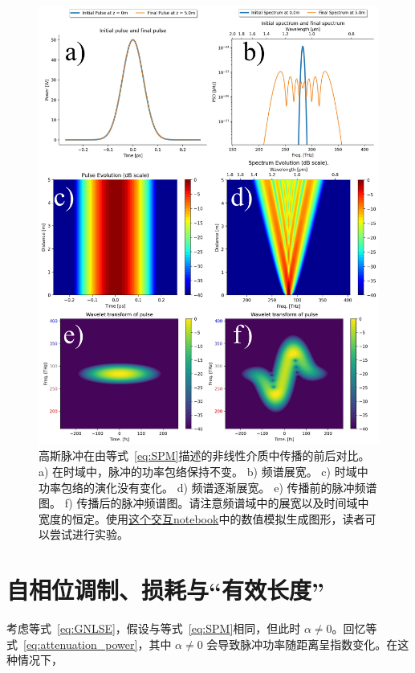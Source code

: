 \begin{figure}
    \centering
    \includegraphics[width=1\linewidth]{figures/SPM_combined.png}
    \caption{ 高斯脉冲在由等式~\ref{eq:SPM}描述的非线性介质中传播的前后对比。
    a) 在时域中，脉冲的功率包络保持不变。 b) 频谱展宽。 c) 时域中功率包络的演化没有变化。 d) 频谱逐渐展宽。 e) 传播前的脉冲频谱图。 f) 传播后的脉冲频谱图。请注意频谱域中的展宽以及时间域中宽度的恒定。使用\href{https://colab.research.google.com/drive/1P41F4hO6Mv12RsEkpogYv5teQyFZ6iW0?usp=sharing}{这个交互notebook}中的数值模拟生成图形，读者可以尝试进行实验。}
    \label{fig:SPM_before_and_after}
\end{figure}


\section{自相位调制、损耗与“有效长度”}
考虑等式~\ref{eq:GNLSE}，假设与等式~\ref{eq:SPM}相同，但此时 $\alpha\neq0$。回忆等式~\ref{eq:attenuation_power}，其中 $\alpha\neq0$ 会导致脉冲功率随距离呈指数变化。在这种情况下，

